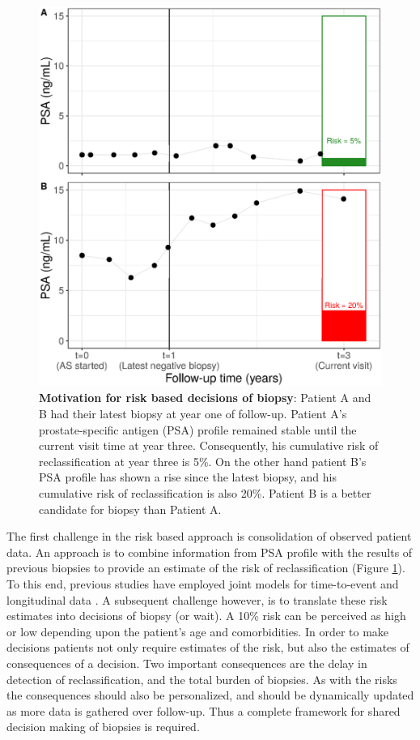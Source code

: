 \begin{figure}[!htb]
\centerline{\includegraphics[width=\columnwidth]{images/riskBasedExample.eps}}
\caption{\textbf{Motivation for risk based decisions of biopsy}: Patient A and B had their latest biopsy at year one of follow-up. Patient A's prostate-specific antigen (PSA) profile remained stable until the current visit time at year three. Consequently, his cumulative risk of reclassification at year three is 5\%. On the other hand patient B's PSA profile has shown a rise since the latest biopsy, and his cumulative risk of reclassification is also 20\%. Patient B is a better candidate for biopsy than Patient A.}
\label{fig:riskBasedExample}
\end{figure}

The first challenge in the risk based approach is consolidation of observed patient data. An approach is to combine information from PSA profile with the results of previous biopsies to provide an estimate of the risk of reclassification (Figure \ref{fig:riskBasedExample}). To this end, previous studies have employed joint models for time-to-event and longitudinal data \citep{rizopoulos2012joint,tomer2019,coley2017prediction}. A subsequent challenge however, is to translate these risk estimates into decisions of biopsy (or wait). A 10\% risk can be perceived as high or low depending upon the patient's age and comorbidities. In order to make decisions patients not only require estimates of the risk, but also the estimates of consequences of a decision. Two important consequences are the delay in detection of reclassification, and the total burden of biopsies. As with the risks the consequences should also be personalized, and should be dynamically updated as more data is gathered over follow-up. Thus a complete framework for shared decision making of biopsies is required.

